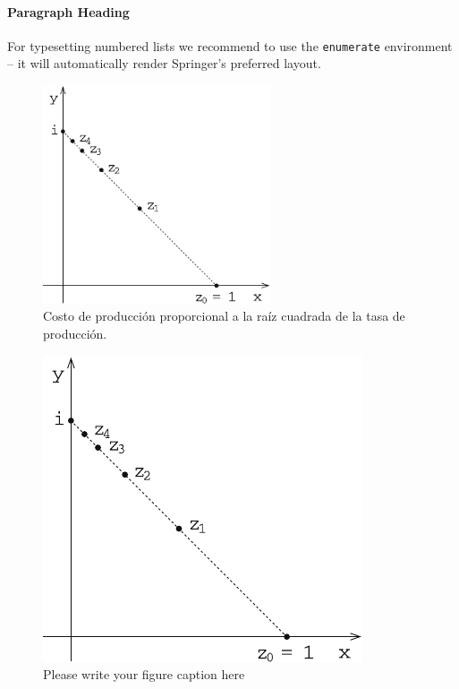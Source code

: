 \paragraph{Paragraph Heading}
For typesetting numbered lists we recommend to use the \verb|enumerate| environment -- it will automatically render Springer's preferred layout.
\begin{figure}[h]
	\centering
	\includegraphics[width=0.6\textwidth]{./img/example}
	\caption{Costo de producción proporcional a la raíz cuadrada de la tasa de producción.}
\end{figure}
\begin{figure}[t]
\sidecaption[t]
\includegraphics[scale=.65]{./img/example}
\caption{Please write your figure caption here}
\label{fig:2}       %
\end{figure}

